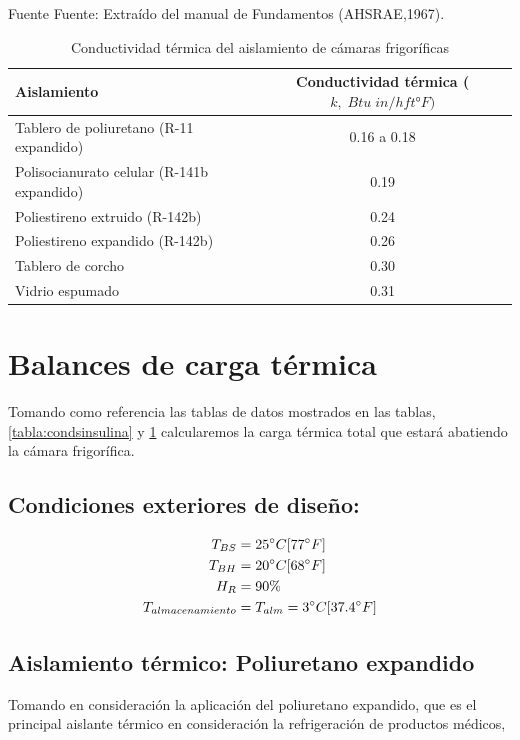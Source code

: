 \begin{table}[H]
	\centering
	\caption{Conductividad térmica del aislamiento de cámaras frigoríficas}Fuente Fuente: Extraído del manual de Fundamentos (AHSRAE,1967).
	\begin{tabular}{lc}
		\hline
		\textbf{Aislamiento} & \textbf{Conductividad térmica ($k,\; Btu\; in/h ft °F)$} \\
		 \hline
		Tablero de poliuretano (R-11 expandido)   & 0.16 a 0.18 \\  
		Polisocianurato celular (R-141b expandido) & 0.19 \\  
		Poliestireno extruido (R-142b)             & 0.24 \\  
		Poliestireno expandido (R-142b)            & 0.26 \\  
		Tablero de corcho                          & 0.30 \\  
		Vidrio espumado                            & 0.31 \\ 
		\hline 
	\end{tabular}
	\label{tabla:aislantes}
\end{table}



\section{Balances de carga térmica}
Tomando como referencia las tablas de datos mostrados en las tablas, \ref{tabla:condsinsulina} y \ref{tabla:aislantes} calcularemos la carga térmica total que estará abatiendo la cámara frigorífica.

\subsection{Condiciones exteriores de diseño:}  
 \begin{equation} 
 \begin{aligned}
 	 T_{BS} &= 25^\circ C [77^\circ F] \\
 	T_{BH} &= 20^\circ C [68^\circ F] \\
 	H_R &= 90\%\\
 	T_{almacenamiento}& = T_{alm} = 3^\circ C [37.4^\circ F]
 	 \end{aligned} 		 
 \end{equation}
 
	
 \subsection{Aislamiento térmico: Poliuretano expandido}
	Tomando en consideración la aplicación del poliuretano expandido, que es el principal aislante térmico en consideración la refrigeración de productos médicos, 
	
